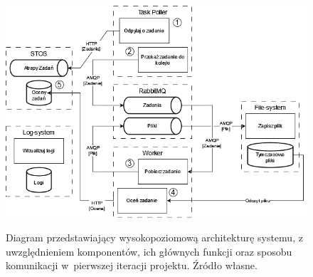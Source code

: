 \begin{figure}[!h]
	\begin{center}
		\resizebox{1.0\textwidth}{!} {
			\includegraphics{img/1/i1_arch.png}
		}
		\caption[Architektura po pierwszej iteracji]{Diagram przedstawiający wysokopoziomową architekturę systemu, z uwzględnieniem komponentów, ich głównych funkcji oraz sposobu komunikacji w~pierwszej iteracji projektu. Źródło własne.}
		\label{i1}
	\end{center}
\end{figure}

